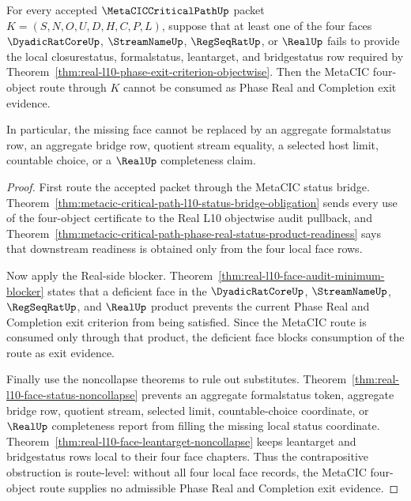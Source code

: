 \begin{theorem}
\label{thm:metacic-critical-path-four-face-deficiency-refusal}
For every accepted $\MetaCICCriticalPathUp$ packet $K=(S,N,O,U,D,H,C,P,L)$, suppose that at least one of the four faces $\DyadicRatCoreUp$, $\StreamNameUp$, $\RegSeqRatUp$, or $\RealUp$ fails to provide the local closurestatus, formalstatus, leantarget, and bridgestatus row required by Theorem~\ref{thm:real-l10-phase-exit-criterion-objectwise}. Then the MetaCIC four-object route through $K$ cannot be consumed as Phase Real and Completion exit evidence.

In particular, the missing face cannot be replaced by an aggregate formalstatus row, an aggregate bridge row, quotient stream equality, a selected host limit, countable choice, or a $\RealUp$ completeness claim.
\end{theorem}
\begin{proof}
First route the accepted packet through the MetaCIC status bridge. Theorem~\ref{thm:metacic-critical-path-l10-status-bridge-obligation} sends every use of the four-object certificate to the Real L10 objectwise audit pullback, and Theorem~\ref{thm:metacic-critical-path-phase-real-status-product-readiness} says that downstream readiness is obtained only from the four local face rows.

Now apply the Real-side blocker. Theorem~\ref{thm:real-l10-face-audit-minimum-blocker} states that a deficient face in the $\DyadicRatCoreUp$, $\StreamNameUp$, $\RegSeqRatUp$, and $\RealUp$ product prevents the current Phase Real and Completion exit criterion from being satisfied. Since the MetaCIC route is consumed only through that product, the deficient face blocks consumption of the route as exit evidence.

Finally use the noncollapse theorems to rule out substitutes. Theorem~\ref{thm:real-l10-face-status-noncollapse} prevents an aggregate formalstatus token, aggregate bridge row, quotient stream, selected limit, countable-choice coordinate, or $\RealUp$ completeness report from filling the missing local status coordinate. Theorem~\ref{thm:real-l10-face-leantarget-noncollapse} keeps leantarget and bridgestatus rows local to their four face chapters. Thus the contrapositive obstruction is route-level: without all four local face records, the MetaCIC four-object route supplies no admissible Phase Real and Completion exit evidence.
\end{proof}


